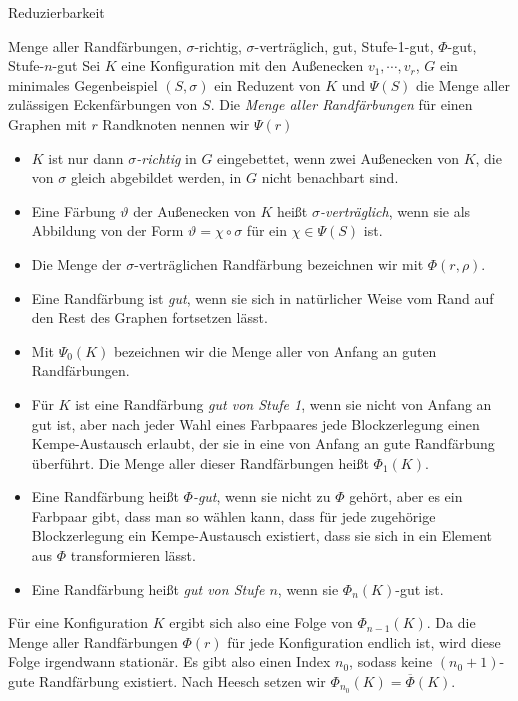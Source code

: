 \begin{section}{Reduzierbarkeit}
 \begin{definition}{Menge aller Randfärbungen, $\sigma$-richtig, $\sigma$-verträglich, gut, Stufe-1-gut, $\Phi$-gut, Stufe-$n$-gut}
  Sei $K$ eine Konfiguration mit den Außenecken $v_1,\cdots,v_r$, $G$ ein minimales Gegenbeispiel $(S,\sigma)$ ein Reduzent von $K$ und $\Psi(S)$ die Menge aller zulässigen Eckenfärbungen von $S$. Die \textit{Menge aller Randfärbungen} für einen Graphen mit $r$ Randknoten nennen wir $\Psi(r)$
  \begin{itemize}
   \item $K$ ist nur dann \textit{$\sigma$-richtig} in $G$ eingebettet, wenn zwei Außenecken von $K$, die von $\sigma$ gleich abgebildet werden, in $G$ nicht benachbart sind. 
   \item Eine Färbung $\vartheta$ der Außenecken von $K$ heißt \textit{$\sigma$-verträglich}, wenn sie als Abbildung von der Form $\vartheta = \chi \circ \sigma$ für ein $\chi \in \Psi(S)$ ist.
   \item Die Menge der $\sigma$-verträglichen Randfärbung bezeichnen wir mit $\Phi(r,\rho)$.
   \item Eine Randfärbung ist \textit{gut}, wenn sie sich in natürlicher Weise vom Rand auf den Rest des Graphen fortsetzen lässt.
   \item Mit $\Psi_0(K)$ bezeichnen wir die Menge aller von Anfang an guten Randfärbungen.
   \item Für $K$ ist eine Randfärbung \textit{gut von Stufe 1}, wenn sie nicht von Anfang an gut ist, aber nach jeder Wahl eines Farbpaares jede Blockzerlegung einen Kempe-Austausch erlaubt, der sie in eine von Anfang an gute Randfärbung überführt. Die Menge aller dieser Randfärbungen heißt $\Phi_1(K)$.
   \item Eine Randfärbung heißt \textit{$\Phi$-gut}, wenn sie nicht zu $\Phi$ gehört, aber es ein Farbpaar gibt, dass man so wählen kann, dass für jede zugehörige Blockzerlegung ein Kempe-Austausch existiert, dass sie sich in ein Element aus $\Phi$ transformieren lässt.
   \item Eine Randfärbung heißt \textit{gut von Stufe $n$}, wenn sie $\Phi_n(K)$-gut ist.
  \end{itemize}
  Für eine Konfiguration $K$ ergibt sich also eine Folge von $\Phi_{n-1}(K)$. Da die Menge aller Randfärbungen $\Phi(r)$ für jede Konfiguration endlich ist, wird diese Folge irgendwann stationär. Es gibt also einen Index $n_0$, sodass keine $(n_0+1)$-gute Randfärbung existiert. Nach Heesch setzen wir $\Phi_{n_0}(K) = \overline{\Phi}(K)$.
 \end{definition}


\end{section}
